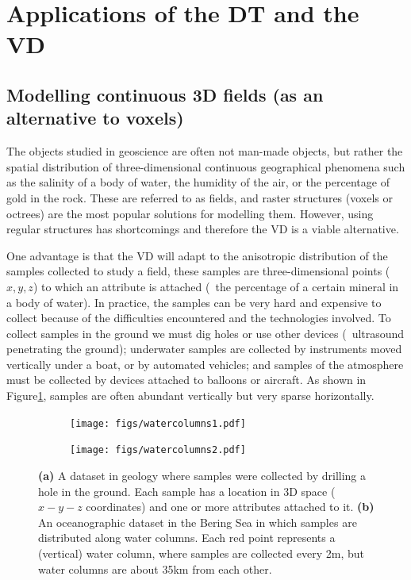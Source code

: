 %
\section[Applications]{Applications of the DT and the VD}



\subsection{Modelling continuous 3D fields (as an alternative to voxels)}

The objects studied in geoscience are often not man-made objects, but rather the spatial distribution of three-dimensional continuous geographical phenomena such as the salinity of a body of water, the humidity of the air, or the percentage of gold in the rock. 
These are referred to as fields, and raster structures (voxels or octrees) are the most popular solutions for modelling them.
However, using regular structures has shortcomings and therefore the VD is a viable alternative.

One advantage is that the VD will adapt to the anisotropic distribution of the samples collected to study a field, these samples are three-dimensional points ($x,y,z$) to which an attribute is attached (\eg\ the percentage of a certain mineral in a body of water).
In practice, the samples can be very hard and expensive to collect because of the difficulties encountered and the technologies involved. 
To collect samples in the ground we must dig holes or use other devices (\eg\ ultrasound penetrating the ground); underwater samples are collected by instruments moved vertically under a boat, or by automated vehicles; and samples of the atmosphere must be collected by devices attached to balloons or aircraft. 
As shown in Figure\ref{fig:watercolumns}, samples are often abundant vertically but very sparse horizontally. 
\begin{figure}
  \centering
  \begin{subfigure}[b]{0.38\linewidth}
    \centering
    \texttt{[image: figs/watercolumns1.pdf]}
    \caption{}
  \end{subfigure}%
  \qquad
  \begin{subfigure}[b]{0.45\linewidth}
    \centering
    \texttt{[image: figs/watercolumns2.pdf]}
    \caption{}
  \end{subfigure}
\caption[A dataset in geology]{\textbf{(a)} A dataset in geology where samples were collected by drilling a hole in the ground. Each sample has a location in 3D space ($x-y-z$ coordinates) and one or more attributes attached to it. \textbf{(b)} An oceanographic dataset in the Bering Sea in which samples are distributed along water columns. Each red point represents a (vertical) water column, where samples are collected every 2m, but water columns are about 35km from each other.}%
\label{fig:watercolumns}%
\end{figure}

